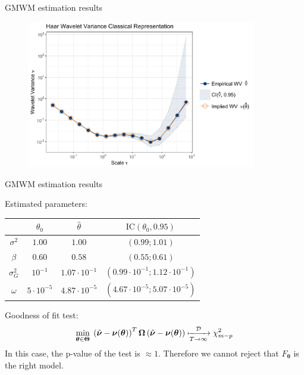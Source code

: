 \documentclass[envcountsect,usenames,dvipsnames]{beamer}
\theoremstyle{mystyle}
\begin{document}
\begin{frame}{GMWM estimation results}
	\begin{figure}
	    \centering
	  \includegraphics[width = 10cm]{Images/gmwm_example.pdf}
	\end{figure}
\end{frame}

\begin{frame}{GMWM estimation results}
	\begin{exampleblock}{Estimated parameters:}
		\begin{table}
			\centering
			\begin{tabular}{c c c c}
				\toprule
				& ${\theta}_0$ & $\hat{{\theta}}$ & $\text{IC}\left(\theta_0, 0.95\right)$ \\
				\midrule
				$\sigma^2$ & $1.00$ & $1.00$ & $\left(0.99 ; 1.01 \right)$ \\
				$\beta$ & $0.60$ & $0.58$ & $\left(0.55 ; 0.61 \right)$\\
				$\sigma_{G}^2$ & $10^{-1}$ & $1.07 \cdot 10^{-1}$ & $\left(0.99 \cdot 10^{-1} ; 1.12 \cdot 10^{-1} \right)$ \\
				$\omega$ & $5 \cdot 10^{-5}$ & $4.87 \cdot 10^{-5}$ &  $\left(4.67 \cdot 10^{-5} ; 5.07 \cdot 10^{-5} \right)$\\
				\bottomrule
			\end{tabular}
		\end{table}
	\end{exampleblock}
		\begin{exampleblock}{Goodness of fit test:}
			\begin{equation*}
					\underset{\bm{\theta} \in \bm{\Theta} }{\min} \;
					\left(\hat{\bm{\nu}} - \bm{\nu}(\bm{\theta})\right)^{T} \bm{\Omega} \left(\hat{\bm{\nu}} - \bm{\nu}(\bm{\theta})\right) \xmapsto[T\rightarrow\infty]{\mathcal{D}} \chi^2_{m - p}
			\end{equation*}
			In this case, the p-value of the test is $\approx 1$. Therefore we cannot reject that $F_{\bm{\theta}}$ is the right model.
		\end{exampleblock}
\end{frame}
\end{document}
